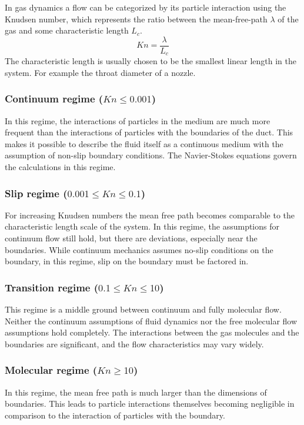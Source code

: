 	In gas dynamics a flow can be categorized by its particle interaction using the Knudsen number, which represents the ratio between the mean-free-path $\lambda$ of the gas and some characteristic length $L_c$.
	$$
		Kn=\frac{\lambda}{L_c}
	$$
	The characteristic length is usually chosen to be the smallest linear length in the system.
	For example the throat diameter of a nozzle. \cite{putignano2012supersonic}
\subsubsection*{Continuum regime (\(Kn \leq 0.001\))}
	
	In this regime, the interactions of particles in the medium are much more frequent than the interactions of particles with the boundaries of the duct.
	This makes it possible to describe the fluid itself as a continuous medium with the assumption of non-slip boundary conditions.
	The Navier-Stokes equations govern the calculations in this regime.
	

\subsubsection*{Slip regime (\(0.001 \leq Kn \leq 0.1\))}

	For increasing Knudsen numbers the mean free path becomes comparable to the characteristic length scale of the system.
	In this regime, the assumptions for continuum flow still hold, but there are deviations, especially near the boundaries.
	While continuum mechanics assumes no-slip conditions on the boundary, in this regime, slip on the boundary must be factored in.

	

\subsubsection*{Transition regime (\(0.1 \leq Kn \leq 10\))}
	
	This regime is a middle ground between continuum and fully molecular flow.
	Neither the continuum assumptions of fluid dynamics nor the free molecular flow assumptions hold completely.
	The interactions between the gas molecules and the boundaries are significant, and the flow characteristics may vary widely.

\subsubsection*{Molecular regime (\(Kn \geq 10\))}

	In this regime, the mean free path is much larger than the dimensions of boundaries.
	This leads to particle interactions themselves becoming negligible in comparison to the interaction of particles with the boundary.
	\cite{rapp2017microfluidics}
	
